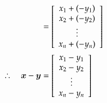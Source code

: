 \begin{align}
                    &=
                    \left[
                        \begin{array}{c}
                            x_{1}  +(-y_{1}) \\
                            x_{2}  +(-y_{2}) \\
                            \vdots \\
                            x_{n}  +(-y_{n}) \\
                        \end{array}
                    \right] \notag \\
                    \therefore \quad
                    \boldsymbol{x} - \boldsymbol{y}
                    &=
                    \left[
                        \begin{array}{c}
                            x_{1}  -y_{1} \\
                            x_{2}  -y_{2} \\
                            \vdots \\
                            x_{n}  -y_{n} \\
                        \end{array}
                    \right]
                \end{align}

